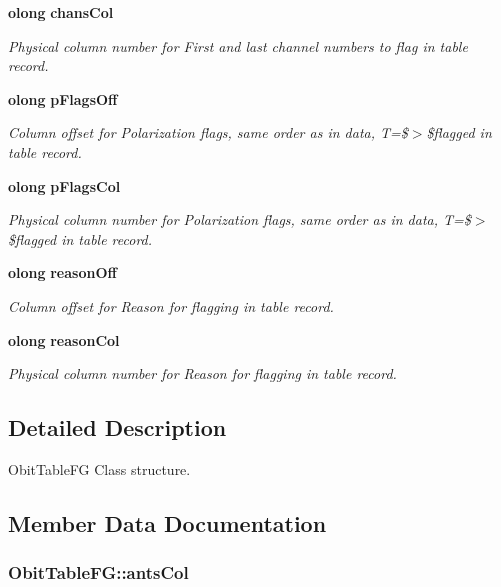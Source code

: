 \begin{CompactItemize}
{\bf olong} {\bf chans\-Col}
\begin{CompactList}\small\item\em Physical column number for First and last channel numbers to flag in table record. \item\end{CompactList}\item 
{\bf olong} {\bf p\-Flags\-Off}
\begin{CompactList}\small\item\em Column offset for Polarization flags, same order as in data, T=\$$>$\$flagged in table record. \item\end{CompactList}\item 
{\bf olong} {\bf p\-Flags\-Col}
\begin{CompactList}\small\item\em Physical column number for Polarization flags, same order as in data, T=\$$>$\$flagged in table record. \item\end{CompactList}\item 
{\bf olong} {\bf reason\-Off}
\begin{CompactList}\small\item\em Column offset for Reason for flagging in table record. \item\end{CompactList}\item 
{\bf olong} {\bf reason\-Col}
\begin{CompactList}\small\item\em Physical column number for Reason for flagging in table record. \item\end{CompactList}\end{CompactItemize}


\subsection{Detailed Description}
Obit\-Table\-FG Class structure. 



\subsection{Member Data Documentation}
\subsubsection{ {\bf Obit\-Table\-FG::ants\-Col}}\label{structObitTableFG_o22}


